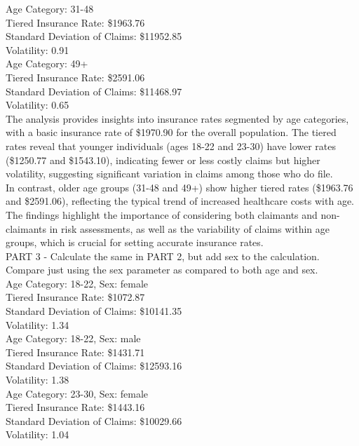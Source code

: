 \documentclass[12pt]{exam}
\begin{document}
\begin{questions}
Age Category: 31-48\\
Tiered Insurance Rate: \$1963.76\\
Standard Deviation of Claims: \$11952.85\\
Volatility: 0.91\\

Age Category: 49+\\
Tiered Insurance Rate: \$2591.06\\
Standard Deviation of Claims: \$11468.97\\
Volatility: 0.65\\

The analysis provides insights into insurance rates segmented by age categories, with a basic insurance rate of \$1970.90 for the overall population. The tiered rates reveal that younger individuals (ages 18-22 and 23-30) have lower rates (\$1250.77 and \$1543.10), indicating fewer or less costly claims but higher volatility, suggesting significant variation in claims among those who do file.\\

In contrast, older age groups (31-48 and 49+) show higher tiered rates (\$1963.76 and \$2591.06), reflecting the typical trend of increased healthcare costs with age. The findings highlight the importance of considering both claimants and non-claimants in risk assessments, as well as the variability of claims within age groups, which is crucial for setting accurate insurance rates.\\

PART 3 - Calculate the same in PART 2, but add sex to the calculation. Compare just using the sex parameter as compared to both age and sex. \\

Age Category: 18-22, Sex: female\\
Tiered Insurance Rate: \$1072.87\\
Standard Deviation of Claims: \$10141.35\\
Volatility: 1.34\\

Age Category: 18-22, Sex: male\\
Tiered Insurance Rate: \$1431.71\\
Standard Deviation of Claims: \$12593.16\\
Volatility: 1.38\\

Age Category: 23-30, Sex: female\\
Tiered Insurance Rate: \$1443.16\\
Standard Deviation of Claims: \$10029.66\\
Volatility: 1.04\\


\end{questions}
\end{document}
